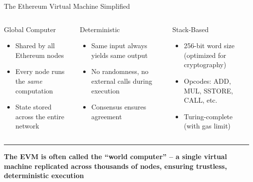 \documentclass[8pt,aspectratio=169]{beamer}
\newcommand{\bottomnote}[1]{\vfill\vspace{-2mm}\textcolor{mllavender2}{\rule{\textwidth}{0.4pt}}\vspace{1mm}\footnotesize\textbf{#1}}
\begin{document}
\begin{frame}{The Ethereum Virtual Machine Simplified}
\vspace{3mm}
\begin{columns}[T]
\begin{block}{\textcolor{mlblue}{Global Computer}}
\footnotesize
\begin{itemize}
  \item Shared by all Ethereum nodes
  \item Every node runs the \emph{same} computation
  \item State stored across the entire network
\end{itemize}
\end{block}
\begin{block}{\textcolor{mlgreen}{Deterministic}}
\footnotesize
\begin{itemize}
  \item Same input always yields same output
  \item No randomness, no external calls during execution
  \item Consensus ensures agreement
\end{itemize}
\end{block}
\begin{block}{\textcolor{mlorange}{Stack-Based}}
\footnotesize
\begin{itemize}
  \item 256-bit word size (optimized for cryptography)
  \item Opcodes: ADD, MUL, SSTORE, CALL, etc.
  \item Turing-complete (with gas limit)
\end{itemize}
\end{block}
\end{columns}
\bottomnote{The EVM is often called the ``world computer'' -- a single virtual machine replicated across thousands of nodes, ensuring trustless, deterministic execution}
\end{frame}
\end{document}
